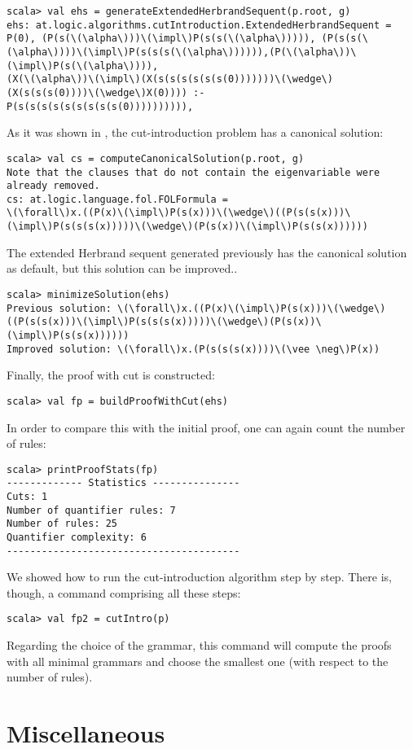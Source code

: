 \documentclass[a4paper,11pt]{article}
\newcommand{\impl}{\supset} %
\begin{document}
\begin{lstlisting}
scala> val ehs = generateExtendedHerbrandSequent(p.root, g)
ehs: at.logic.algorithms.cutIntroduction.ExtendedHerbrandSequent = 
P(0), (P(s(\(\alpha\)))\(\impl\)P(s(s(\(\alpha\))))), (P(s(s(\(\alpha\))))\(\impl\)P(s(s(s(\(\alpha\)))))),(P(\(\alpha\))\(\impl\)P(s(\(\alpha\)))),
(X(\(\alpha\))\(\impl\)(X(s(s(s(s(s(s(0)))))))\(\wedge\)(X(s(s(s(0))))\(\wedge\)X(0)))) :- 
P(s(s(s(s(s(s(s(s(s(0)))))))))),
\end{lstlisting}
As it was shown in \cite{cutIntro2013}, the cut-introduction problem has a
canonical solution:
\begin{lstlisting}
scala> val cs = computeCanonicalSolution(p.root, g)
Note that the clauses that do not contain the eigenvariable were already removed.
cs: at.logic.language.fol.FOLFormula = 
\(\forall\)x.((P(x)\(\impl\)P(s(x)))\(\wedge\)((P(s(s(x)))\(\impl\)P(s(s(s(x)))))\(\wedge\)(P(s(x))\(\impl\)P(s(s(x))))))
\end{lstlisting}
The extended Herbrand sequent generated previously has the canonical solution as
default, but this solution can be improved.. 
\begin{lstlisting}
scala> minimizeSolution(ehs)
Previous solution: \(\forall\)x.((P(x)\(\impl\)P(s(x)))\(\wedge\)((P(s(s(x)))\(\impl\)P(s(s(s(x)))))\(\wedge\)(P(s(x))\(\impl\)P(s(s(x))))))
Improved solution: \(\forall\)x.(P(s(s(s(x))))\(\vee \neg\)P(x))
\end{lstlisting}
Finally, the proof with cut is constructed:
\begin{lstlisting}
scala> val fp = buildProofWithCut(ehs)
\end{lstlisting}
In order to compare this with the initial proof, one can again count
the number of rules:
\begin{lstlisting}
scala> printProofStats(fp)
------------- Statistics ---------------
Cuts: 1
Number of quantifier rules: 7
Number of rules: 25
Quantifier complexity: 6
----------------------------------------
\end{lstlisting}
We showed how to run the cut-introduction algorithm step by step. There is,
though, a command comprising all these steps:
\begin{lstlisting}
scala> val fp2 = cutIntro(p)
\end{lstlisting}
Regarding the choice of the grammar, this command will compute the proofs with
all minimal grammars and choose the smallest one (with respect to the number of rules).


\section{Miscellaneous}
\end{document}
